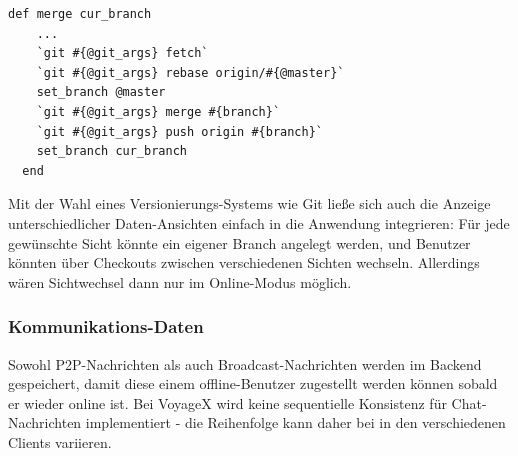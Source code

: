 \lstset{language=Ruby}
\begin{lstlisting}[frame=single,xleftmargin=0pt,numbers=none]
  def merge cur_branch
  	...
    `git #{@git_args} fetch`
    `git #{@git_args} rebase origin/#{@master}`
    set_branch @master
    `git #{@git_args} merge #{branch}`
    `git #{@git_args} push origin #{branch}`
    set_branch cur_branch
  end
\end{lstlisting}
Mit der Wahl eines Versionierungs-Systems wie Git ließe sich auch die Anzeige unterschiedlicher Daten-Ansichten einfach in die Anwendung integrieren: Für jede gewünschte Sicht könnte ein eigener Branch angelegt werden, und Benutzer könnten über Checkouts zwischen verschiedenen Sichten wechseln. Allerdings wären Sichtwechsel dann nur im Online-Modus möglich.

\subsubsection{Kommunikations-Daten}
Sowohl P2P-Nachrichten als auch Broadcast-Nachrichten werden im Backend gespeichert, damit diese einem offline-Benutzer zugestellt werden können sobald er wieder online ist.
Bei VoyageX wird keine sequentielle Konsistenz für Chat-Nachrichten implementiert - die Reihenfolge kann daher bei in den verschiedenen Clients variieren. 
 

